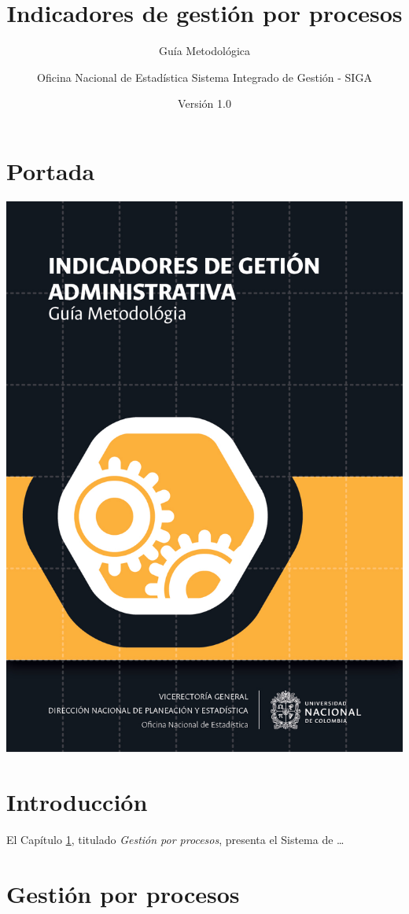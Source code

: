 \documentclass[
]{book}
\title{Indicadores de gestión por procesos}
\subtitle{Guía Metodológica}
\author{ Oficina Nacional de Estadística Sistema Integrado de Gestión - SIGA}
\date{Versión 1.0}
\begin{document}
\maketitle

{
\setcounter{tocdepth}{1}
\tableofcontents
}
\hypertarget{portada}{%
\chapter*{Portada}\label{portada}}

\begin{center}\includegraphics[width=0.75\linewidth]{Imagenes/Portada} \end{center}

\hypertarget{intro}{%
\chapter*{Introducción}\label{intro}}

El Capítulo \ref{procesos}, titulado \emph{Gestión por procesos}, presenta el Sistema de \ldots{}

\hypertarget{procesos}{%
\chapter{Gestión por procesos}\label{procesos}}
\end{document}

